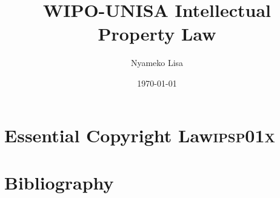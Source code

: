\documentclass[11pt]{article}
\author{Nyameko Lisa}
\date{\today}
\title{WIPO-UNISA Intellectual Property Law}
\begin{document}
\maketitle
\tableofcontents


\section{Essential Copyright Law\hfill{}\textsc{ipsp01x}}
\label{sec:org8e170b3}
\cite{kogelnik66_laser_beams_reson} 

\cite{corbett95_walite_v_fnb} 


\section{Bibliography}
\label{sec:org2bedc6f}
\printbibliography
\end{document}
